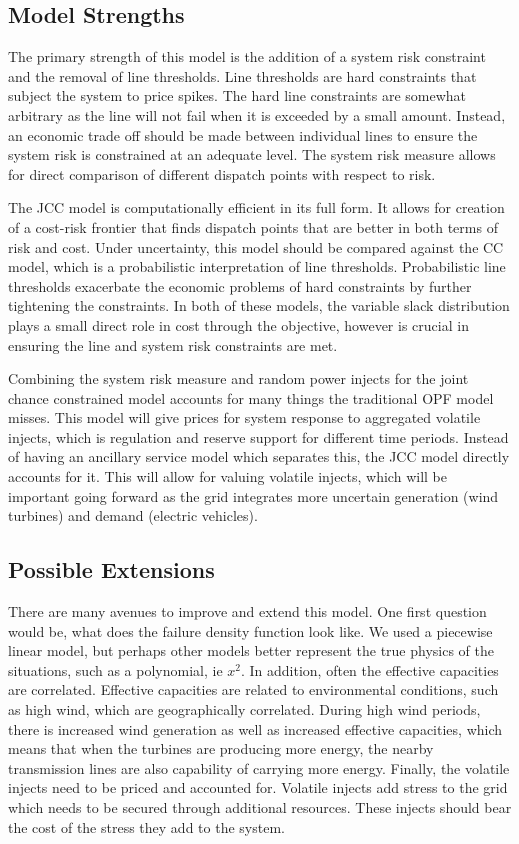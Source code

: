 \subsection{Model Strengths}
The primary strength of this model is the addition of a system risk constraint and the removal of line thresholds. Line thresholds are hard constraints that subject the system to price spikes.  The hard line constraints are somewhat arbitrary as the line will not fail when it is exceeded by a small amount.  Instead, an economic trade off should be made between individual lines to ensure the system risk is constrained at an adequate level.  The system risk measure allows for direct comparison of different dispatch points with respect to risk.

The JCC model is computationally efficient in its full form.  It allows for creation of a cost-risk frontier that finds dispatch points that are better in both terms of risk and cost.  Under uncertainty, this model should be compared against the CC model, which is a probabilistic interpretation of line thresholds.  Probabilistic line thresholds exacerbate the economic problems of hard constraints by further tightening the constraints.  In both of these models, the variable slack distribution plays a small direct role in cost through the objective, however is crucial in ensuring the line and system risk constraints are met.  
  
Combining the system risk measure and random power injects for the joint chance constrained model accounts for many things the traditional OPF model misses.  This model will give prices for system response to aggregated volatile injects, which is regulation and reserve support for different time periods.  Instead of having an ancillary service model which separates this, the JCC model directly accounts for it.  This will allow for valuing volatile injects, which will be important going forward as the grid integrates more uncertain generation (wind turbines) and demand (electric vehicles).

\subsection{Possible Extensions}
There are many avenues to improve and extend this model.  One first question would be, what does the failure density function look like.  We used a piecewise linear model, but perhaps other models better represent the true physics of the situations, such as a polynomial, ie $x^2$.  In addition, often the effective capacities are correlated.  Effective capacities are related to environmental conditions, such as high wind, which are geographically correlated.  During high wind periods, there is increased wind generation as well as increased effective capacities, which means that when the turbines are producing more energy, the nearby transmission lines are also capability of carrying more energy.  Finally, the volatile injects need to be priced and accounted for.  Volatile injects add stress to the grid which needs to be secured through additional resources.  These injects should bear the cost of the stress they add to the system.


\theendnotes

\setcounter{endnote}{0}
